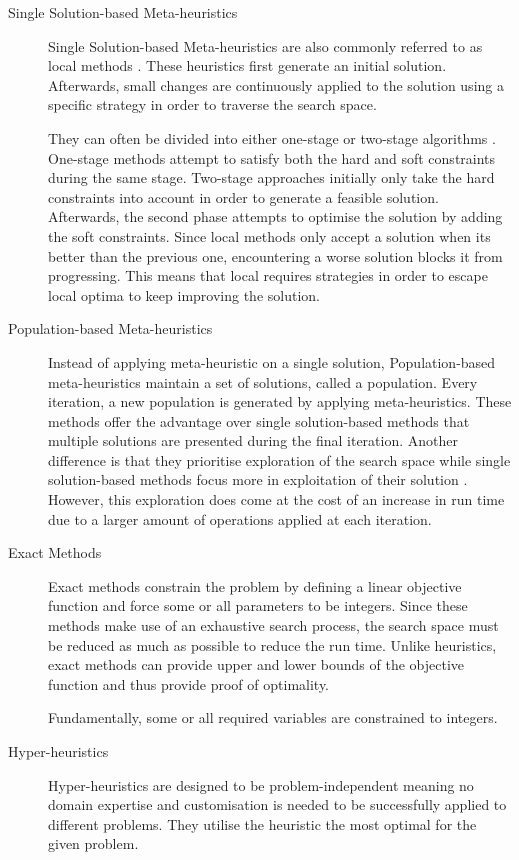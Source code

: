 \begin{description}
\item [Single Solution-based Meta-heuristics]

Single Solution-based Meta-heuristics are also commonly referred to as \acrfull{local} methods \cite{lin1973}. These heuristics first generate an initial solution. Afterwards, small changes are continuously applied to the solution using a specific strategy in order to traverse the search space. 

They can often be divided into either one-stage or two-stage algorithms \cite{lewis2008}. One-stage methods attempt to satisfy both the hard and soft constraints during the same stage. Two-stage approaches initially only take the hard constraints into account in order to generate a feasible solution. Afterwards, the second phase attempts to optimise the solution by adding the soft constraints. Since \acrshort{local} methods only accept a solution when its better than the previous one, encountering a worse solution blocks it from progressing. This means that \acrshort{local} requires strategies in order to escape local optima to keep improving the solution. 



\item [Population-based Meta-heuristics]

Instead of applying meta-heuristic on a single solution, Population-based meta-heuristics maintain a set of solutions, called a population. Every iteration, a new population is generated by applying meta-heuristics. These methods offer the advantage over single solution-based methods that multiple solutions are presented during the final iteration. Another difference is that they prioritise exploration of the search space while single solution-based methods focus more in exploitation of their solution  \cite{kohshori2012}. However, this exploration does come at the cost of an increase in run time due to a larger amount of operations applied at each iteration.

\item [Exact Methods] 

Exact methods constrain the problem by defining a linear objective function and force some or all parameters to be integers. Since these methods make use of an exhaustive search process, the search space must be reduced as much as possible to reduce the run time. Unlike heuristics, exact methods can provide upper and lower bounds of the objective function and thus provide proof of optimality.

Fundamentally, some or all required variables are constrained to integers. 

\item [Hyper-heuristics]

Hyper-heuristics\cite{cowling2001} \cite{burke2013} are designed to be problem-independent meaning no domain expertise and customisation is needed to be successfully applied to different problems. They utilise the heuristic the most optimal for the given problem.

\end{description}

